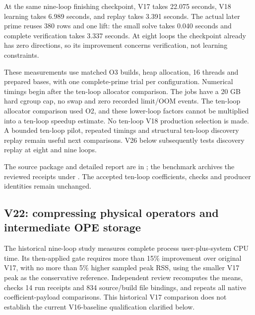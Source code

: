 \documentclass[11pt]{article}
\begin{document}
At the same nine-loop finishing checkpoint, V17 takes 22.075 seconds, V18
learning takes 6.989 seconds, and replay takes 3.391 seconds. The actual later
prime reuses 380 rows and one lift: the small solve takes 0.040 seconds and
complete verification takes 3.337 seconds. At eight loops the checkpoint
already has zero directions, so its improvement concerns verification, not
learning constraints.

These measurements use matched O3 builds, heap allocation, 16 threads and
prepared bases, with one complete-prime trial per configuration. Numerical
timings begin after the ten-loop allocator comparison. The jobs have a 20 GB
hard cgroup cap, no swap and zero recorded limit/OOM events. The ten-loop
allocator comparison used O2, and these lower-loop factors cannot be
multiplied into a ten-loop speedup estimate. No ten-loop V18 production
selection is made. A bounded ten-loop pilot, repeated timings and structural
ten-loop discovery replay remain useful next comparisons. V26 below
subsequently tests discovery replay at eight and nine loops.

The source package and detailed report are in
; the benchmark archives the reviewed
receipts under . The accepted ten-loop
coefficients, checks and producer identities remain unchanged.

\subsection{V22: compressing physical operators and intermediate OPE storage}
The historical nine-loop study measures complete process user-plus-system
CPU time. Its then-applied gate requires more than 15\% improvement over original V17,
with no more than 5\% higher sampled peak RSS, using the smaller V17 peak
as the conservative reference. Independent review recomputes the means,
checks 14 run receipts and 834 source/build file bindings, and repeats all
native coefficient-payload comparisons.
This historical V17 comparison does not establish the current V16-baseline
qualification clarified below.
\end{document}
